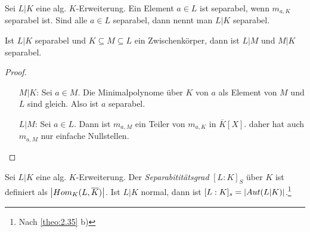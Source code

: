 \documentclass[../main.tex]{subfiles}
\begin{document}
\begin{definition} \label{theo:2.43}
    Sei $L|K$ eine alg. $K$-Erweiterung.
    Ein Element $a\in L$ ist separabel, wenn $m_{a,K}$ separabel ist.
    Sind alle $a\in L$ separabel, dann nennt man $L|K$ separabel.
\end{definition}

\begin{lemma} \label{theo:2.44}
    Ist $L|K$ separabel und $K\subseteq M \subseteq L$ ein Zwischenkörper, dann ist $L|M$ und $M|K$ separabel.
\end{lemma}
\begin{proof}
    \begin{enumerate}
        \item[$M|K$:] Sei $a\in M$. Die Minimalpolynome über $K$ von $a$ als Element von $M$ und $L$ sind gleich. Also ist $a$ separabel.
        \item[$L|M$:] Sei $a\in L$. Dann ist $m_{a,M}$ ein Teiler von $m_{a,K}$ in $\overline{K}[X]$.
        daher hat auch $m_{a,M}$ nur einfache Nullstellen.
    \end{enumerate}
\end{proof}

\begin{definition}
    Sei $L|K$ eine alg. $K$-Erweiterung.
    Der \emph{Separabititätsgrad} $[L:K]_S$ über $K$ ist definiert als $\left\vert Hom_K(L,\overline{K}) \right\vert$.
    Ist $L|K$ normal, dann ist $[L:K]_s = \left\vert Aut(L|K) \right\vert$.\footnote{Nach \cref{theo:2.35} b)} 
\end{definition}
\end{document}
